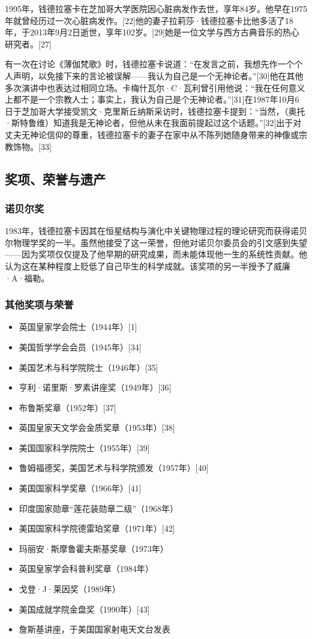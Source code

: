 1995年，钱德拉塞卡在芝加哥大学医院因心脏病发作去世，享年84岁。他早在1975年就曾经历过一次心脏病发作。[22]他的妻子拉莉莎·钱德拉塞卡比他多活了18年，于2013年9月2日逝世，享年102岁。[29]她是一位文学与西方古典音乐的热心研究者。[27]

有一次在讨论《薄伽梵歌》时，钱德拉塞卡说道：“在发言之前，我想先作一个个人声明，以免接下来的言论被误解——我认为自己是一个无神论者。”[30]他在其他多次演讲中也表达过相同立场。卡梅什瓦尔·C·瓦利曾引用他说：“我在任何意义上都不是一个宗教人士；事实上，我认为自己是个无神论者。”[31]在1987年10月6日于芝加哥大学接受凯文·克里斯丘纳斯采访时，钱德拉塞卡提到：“当然，（奥托·斯特鲁维）知道我是无神论者，但他从未在我面前提起过这个话题。”[32]出于对丈夫无神论信仰的尊重，钱德拉塞卡的妻子在家中从不陈列她随身带来的神像或宗教饰物。[33]
\subsection{奖项、荣誉与遗产}
\subsubsection{诺贝尔奖}
1983年，钱德拉塞卡因其在恒星结构与演化中关键物理过程的理论研究而获得诺贝尔物理学奖的一半。虽然他接受了这一荣誉，但他对诺贝尔委员会的引文感到失望——因为奖项仅仅提及了他早期的研究成果，而未能体现他一生的系统性贡献。他认为这在某种程度上贬低了自己毕生的科学成就。该奖项的另一半授予了威廉·A·福勒。
\subsubsection{其他奖项与荣誉}
\begin{itemize}
\item 英国皇家学会院士（1944年）[1]
\item 美国哲学学会会员（1945年）[34]
\item 美国艺术与科学院院士（1946年）[35]
\item 亨利·诺里斯·罗素讲座奖（1949年）[36]
\item 布鲁斯奖章（1952年）[37]
\item 英国皇家天文学会金质奖章（1953年）[38]
\item 美国国家科学院院士（1955年）[39]
\item 鲁姆福德奖，美国艺术与科学院颁发（1957年）[40]
\item 美国国家科学奖章（1966年）[41]
\item 印度国家勋章“莲花装勋章二级”（1968年）
\item 美国国家科学院德雷珀奖章（1971年）[42]
\item 玛丽安·斯摩鲁霍夫斯基奖章（1973年）
\item 英国皇家学会科普利奖章（1984年）
\item 戈登·J·莱因奖（1989年）
\item 美国成就学院金盘奖（1990年）[43]
\item 詹斯基讲座，于美国国家射电天文台发表
\end{itemize}
